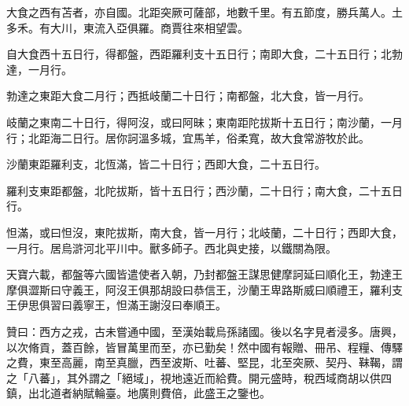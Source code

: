\begin{pinyinscope}
 大食之西有苫者，亦自國。北距突厥可薩部，地數千里。有五節度，勝兵萬人。土多禾。有大川，東流入亞俱羅。商賈往來相望雲。



 自大食西十五日行，得都盤，西距羅利支十五日行；南即大食，二十五日行；北勃達，一月行。



 勃達之東距大食二月行；西抵岐蘭二十日行；南都盤，北大食，皆一月行。



 岐蘭之東南二十日行，得阿沒，或曰阿昧；東南距陀拔斯十五日行；南沙蘭，一月行；北距海二日行。居你訶溫多城，宜馬羊，俗柔寬，故大食常游牧於此。



 沙蘭東距羅利支，北恆滿，皆二十日行；西即大食，二十五日行。



 羅利支東距都盤，北陀拔斯，皆十五日行；西沙蘭，二十日行；南大食，二十五日行。



 怛滿，或曰怛沒，東陀拔斯，南大食，皆一月行；北岐蘭，二十日行；西即大食，一月行。居烏滸河北平川中。獸多師子。西北與史接，以鐵關為限。



 天寶六載，都盤等六國皆遣使者入朝，乃封都盤王謀思健摩訶延曰順化王，勃達王摩俱澀斯曰守義王，阿沒王俱那胡設曰恭信王，沙蘭王卑路斯威曰順禮王，羅利支王伊思俱習曰義寧王，怛滿王謝沒曰奉順王。



 贊曰：西方之戎，古未嘗通中國，至漢始載烏孫諸國。後以名字見者浸多。唐興，以次脩貢，蓋百餘，皆冒萬里而至，亦已勤矣！然中國有報贈、冊吊、程糧、傳驛之費，東至高麗，南至真臘，西至波斯、吐蕃、堅昆，北至突厥、契丹、靺鞨，謂之「八蕃」，其外謂之「絕域」，視地遠近而給費。開元盛時，稅西域商胡以供四鎮，出北道者納賦輪臺。地廣則費倍，此盛王之鑒也。



\end{pinyinscope}